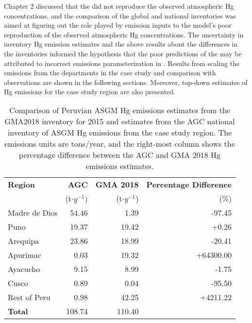 \begin{flushleft}
    Chapter 2 discussed that the \on did not reproduce the observed atmospheric Hg concentrations, and the comparison of the  global and national inventories was aimed at figuring out the role played by emission inputs to the model's poor reproduction of the observed atmospheric Hg concentrations. The uncertainty in inventory Hg emission estimates and the above results about the differences in the inventories informed the hypothesis that the poor predictions of the \on may be attributed to incorrect emissions parameterization in \gc. Results from scaling the emissions from the departments in the case study and comparison with observations are shown in the following sections. Moreover, top-down estimates of Hg emissions for the case study region are also presented.
\end{flushleft}
\setlength{\tabcolsep}{5pt}
\begin{table}[H]
  \begin{center}
    \caption[Comparison of Peruvian ASGM Hg emissions estimates from the GMA2018 inventory for 2015 and estimates from the AGC national inventory of ASGM Hg emissions]{Comparison of Peruvian ASGM Hg emissions estimates from the GMA2018 inventory for 2015 and estimates from the AGC national inventory of ASGM Hg emissions from the case study region. The emissions units are tons/year, and the right-most column shows the percentage difference between the AGC and GMA 2018 Hg emissions estimates. }
    \label{tab:agc_vs_gma18}
    \begin{tabular}{lrrr}
      
    \textbf{Region}     & \textbf{AGC}      & \textbf{GMA 2018}             & \textbf{Percentage Difference}       \\
                        & (t$\cdot y^{-1}$) & (t$\cdot y^{-1}$)                    &        (\%)\\
\hline    
    Madre de Dios       & 54.46             & 1.39                          &    -97.45       \\
    Puno                & 19.37             & 19.42                         &    +0.26     \\
    Arequipa            & 23.86             & 18.99                         &    -20.41       \\ %
    Apurimac            & 0.03              & 19.32                         &    +64300.00    \\
    Ayacucho            & 9.15              & 8.99                          &    -1.75           \\ %
    Cusco               & 0.89              & 0.04                          &    -95.50           \\
    Rest of Peru        &  0.98             & 42.25                         &    +4211.22        \\
   
    \hline
    \textbf{Total}           &108.74           & 110.40      &        \\
    \end{tabular}
  \end{center}
\end{table}

